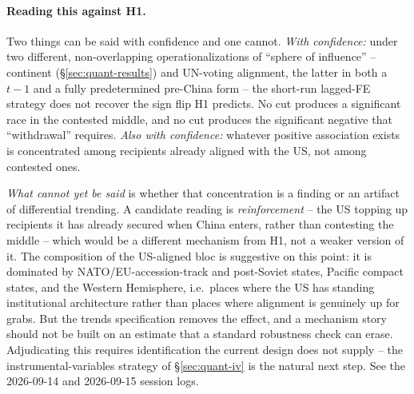 

\paragraph{Reading this against H1.} Two things can be said with confidence and
one cannot. \emph{With confidence:} under two different, non-overlapping
operationalizations of ``sphere of influence'' -- continent
(\S\ref{sec:quant-results}) and UN-voting alignment, the latter in both a
$t-1$ and a fully predetermined pre-China form -- the short-run lagged-FE
strategy does not recover the sign flip H1 predicts. No cut produces a
significant race in the contested middle, and no cut produces the significant
negative that ``withdrawal'' requires. \emph{Also with confidence:} whatever
positive association exists is concentrated among recipients already aligned
with the US, not among contested ones.

\emph{What cannot yet be said} is whether that concentration is a finding or an
artifact of differential trending. A candidate reading is
\emph{reinforcement} -- the US topping up recipients it has already secured
when China enters, rather than contesting the middle -- which would be a
different mechanism from H1, not a weaker version of it. The composition of the
US-aligned bloc is suggestive on this point: it is dominated by
NATO/EU-accession-track and post-Soviet states, Pacific compact states, and the
Western Hemisphere, i.e.\ places where the US has standing institutional
architecture rather than places where alignment is genuinely up for grabs. But
the trends specification removes the effect, and a mechanism story should not
be built on an estimate that a standard robustness check can erase.
Adjudicating this requires identification the current design does not supply --
the instrumental-variables strategy of \S\ref{sec:quant-iv} is the natural next
step. See the 2026-09-14 and 2026-09-15 session logs.

